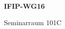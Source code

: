 \documentclass[a4paper]{article}
\begin{document}
\printGenericVSLHeader
\begin{center}
\begin{vsltext}{3cm}{4cm}

   \vspace{0.5cm} 

    \textbf{IFIP-WG16} 

    \vspace{1.5cm}

    Seminarraum 101C

\end{vsltext}

\end{center}
\end{document}
